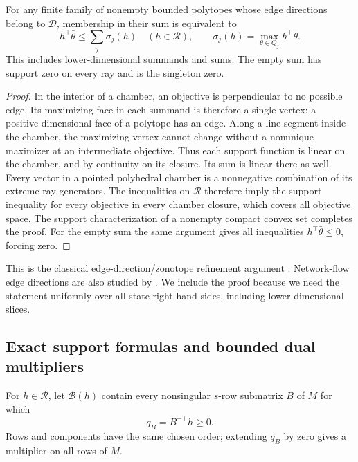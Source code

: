 \begin{lemma}\label{lem:rank-support-library}
For any finite family of nonempty bounded polytopes whose edge directions
belong to $\mathcal D$, membership in their sum is equivalent to
\begin{equation}\label{eq:rank-support-tests}
 h^\top\bar\theta\le\sum_j\sigma_j(h)\quad(h\in\mathcal R),\qquad
 \sigma_j(h)=\max_{\theta\in Q_j}h^\top\theta.
\end{equation}
This includes lower-dimensional summands and sums. The empty sum has
support zero on every ray and is the singleton zero.
\end{lemma}
\begin{proof}
In the interior of a chamber, an objective is perpendicular to no
possible edge. Its maximizing face in each summand is therefore a single
vertex: a positive-dimensional face of a polytope has an edge. Along
a line segment inside the chamber, the maximizing vertex cannot change
without a nonunique maximizer at an intermediate objective. Thus each
support function is linear on the chamber, and by continuity on its
closure. Its sum is linear there as well. Every vector in a pointed
polyhedral chamber is a nonnegative combination of its extreme-ray
generators. The inequalities on $\mathcal R$ therefore imply the support
inequality for every objective in every chamber closure, which covers
all objective space. The support characterization of a nonempty compact
convex set completes the proof. For the empty sum the same argument
gives all inequalities $h^\top\bar\theta\le0$, forcing zero.
\end{proof}

This is the classical edge-direction/zonotope refinement argument
\citep{GritzmannSturmfels1993,OnnRothblum2004,MelamedOnn2014}.
Network-flow edge directions are also studied by
\citet{OnnRothblumTangir2005}. We include the proof because we need the
statement uniformly over all state right-hand sides, including
lower-dimensional slices.

\subsection{Exact support formulas and bounded dual multipliers}\label{subsec:rank-duals}
For $h\in\mathcal R$, let $\mathcal B(h)$ contain every nonsingular
$s$-row submatrix $B$ of $M$ for which
\begin{equation}\label{eq:rank-dual-vector}
 q_B=B^{-\top}h\ge0.
\end{equation}
Rows and components have the same chosen order; extending $q_B$ by zero
gives a multiplier on all rows of $M$.

